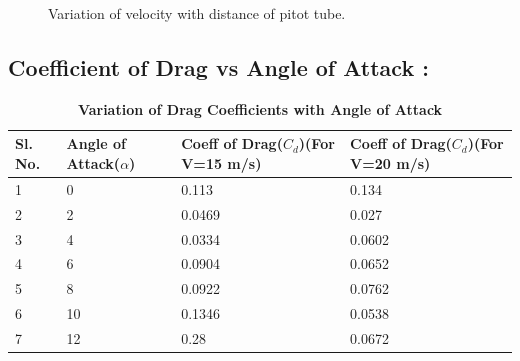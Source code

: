\documentclass[12pt,a4paper]{article}
\begin{document}
\begin{figure}[!ht]
	\begin{center}
	\end{center}
	\caption{Variation of velocity with distance of pitot tube.}
\end{figure}



\newpage









\newpage

\subsection{Coefficient of Drag vs Angle of Attack : } 



\begin{table}[ht]
\centering
\caption{\textbf{Variation of Drag Coefficients with Angle of Attack}}
\vspace{2mm}

\begin{tabular}{|p{20mm}|p{20mm}|p{30mm}|p{30mm}|} 
 \hline
Sl. No. & Angle of Attack($\alpha$)  & Coeff of Drag($C_d$)(For V=15 m/s) & Coeff of Drag($C_d$)(For V=20 m/s) \\ [0.1ex] 
 \hline \hline
1 & 0 &  0.113 & 0.134 \\ 
 \hline
2 & 2 &  0.0469 & 0.027 \\
 \hline
3 & 4 &  0.0334 & 0.0602 \\
 \hline
4 & 6 &  0.0904 & 0.0652  \\
 \hline
5 & 8 &  0.0922 & 0.0762 \\
 \hline
6 & 10 &  0.1346 & 0.0538 \\ 
 \hline
7 & 12 &  0.28 & 0.0672 \\ 
 \hline


\end{tabular}
\end{table}
\end{document}
